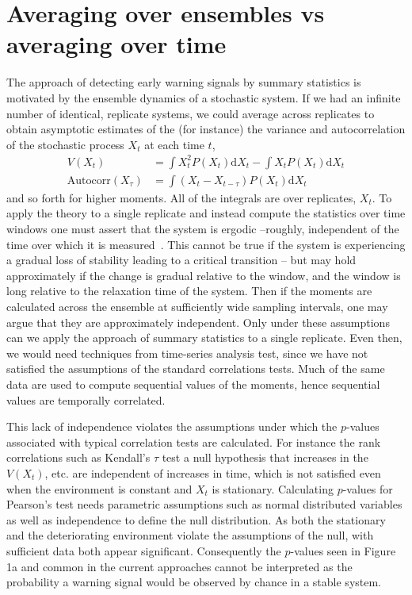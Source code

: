 \documentclass[authoryear, preprint,review,12pt]{elsarticle}
\newcommand{\ud}{\mathrm{d}}
\begin{document}
\section{Averaging over ensembles vs averaging over time}\label{correlations}
The approach of detecting early warning signals by summary statistics is motivated by the ensemble dynamics of a stochastic system.  If we had an infinite number of identical, replicate systems, we could average across replicates to obtain asymptotic estimates of the (for instance) the variance and autocorrelation of the stochastic process $X_t$ at each time $t$, 
\begin{align}
V(X_t) &= \int X_t^2 P(X_t) \ud X_t - \int X_t P(X_t) \ud X_t \\
\text{Autocorr}(X_{\tau}) &= \int (X_t - X_{t-\tau}) P(X_t) \ud X_t 
\end{align}
and so forth for higher moments.  
All of the integrals are over replicates, $X_t$.  
To apply the theory to a single replicate and instead compute the statistics over time windows one must assert that the system is ergodic
--roughly, independent of the time over which it is measured~\citep{Gardiner2009}.  
This cannot be true if the system is experiencing a gradual loss of stability leading to a critical transition -- but may hold  
approximately if the change is gradual relative to the window, and the window is long relative to the relaxation time of the system.
Then if the moments are calculated across the ensemble at sufficiently wide sampling intervals, one may argue that they are approximately independent.  
Only under these assumptions can we apply the approach of summary statistics to a single replicate.  
Even then, we would need techniques from time-series analysis test, 
since we have not satisfied the assumptions of the standard correlations tests.  
Much of the same data are used to compute sequential values of the moments, hence sequential values are temporally correlated.  


This lack of independence violates the assumptions under which the $p$-values associated with typical correlation tests are calculated.
For instance the rank correlations such as Kendall's $\tau$ test a null hypothesis that increases in the $V(X_t)$, etc.
are independent of increases in time, which is not satisfied even when the environment is constant and $X_t$ is stationary.
Calculating $p$-values for Pearson's test needs parametric assumptions such as normal distributed variables as well as independence to define the null distribution.
As both the stationary and the deteriorating environment violate the assumptions of the null, with sufficient data both appear significant.
Consequently the $p$-values seen in Figure 1a and common in the current approaches cannot be interpreted as the probability a warning signal would be observed by chance in a stable system.  
\end{document}
